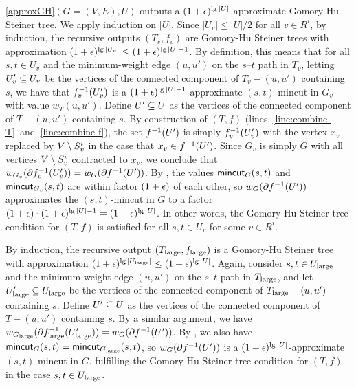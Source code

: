 \BL{}
\ref{approxGH}$(G=(V,E),U)$ outputs a $(1+\epsilon)^{\lg|U|}$-approximate Gomory-Hu Steiner tree.
\EL
\BP
We apply induction on $|U|$. 
Since $|U_v|\le|U|/2$ for all $v\in R^i$, by induction, the recursive outputs $(T_v,f_v)$ are Gomory-Hu Steiner trees with approximation $(1+\epsilon)^{\lg|U_v|}\le(1+\epsilon)^{\lg|U|-1}$.  By definition, this means that for all $s,t\in U_v$ and the minimum-weight edge $(u,u')$ on the $s$--$t$ path in $T_v$, letting $U'_v\subseteq U_v$ be the vertices of the connected component of $T_v-(u,u')$ containing $s$, we have that $f^{-1}_v(U'_v)$ is a $(1+\epsilon)^{\lg|U|-1}$-approximate $(s,t)$-mincut in $G_v$ with value $w_T(u,u')$. Define $U'\subseteq U$ as the vertices of the connected component of $T-(u,u')$ containing $s$. By construction of $(T,f)$ (lines~\ref{line:combine-T}~and~\ref{line:combine-f}), the set $f^{-1}(U')$ is simply $f^{-1}_v(U'_v)$ with the vertex $x_v$ replaced by $V\setminus S^i_v$ in the case that $x_v\in f^{-1}(U')$. Since $G_v$ is simply $G$ with all vertices $V\setminus S^i_v$ contracted to $x_v$, we conclude that $w_{G_v}(\partial f^{-1}_v(U'_v)) = w_G(\partial f^{-1}(U'))$. By , the values $\textsf{\textup{mincut}}_G(s,t)$ and $\textsf{\textup{mincut}}_{G_v}(s,t)$ are within factor $(1+\epsilon)$ of each other, so $w_G(\partial f^{-1}(U'))$ approximates the $(s,t)$-mincut in $G$ to a factor $(1+\epsilon)\cdot(1+\epsilon)^{\lg|U|-1} = (1+\epsilon)^{\lg|U|}$. In other words, the Gomory-Hu Steiner tree condition for $(T,f)$ is satisfied for all $s,t\in U_v$ for some $v\in R^i$.

By induction, the recursive output $(T_{\textup{large}},f_{\textup{large}})$ is a Gomory-Hu Steiner tree with approximation $(1+\epsilon)^{\lg|U_{\textup{large}}|}\le(1+\epsilon)^{\lg|U|}$. Again, consider $s,t\in U_{\textup{large}}$ and the minimum-weight edge $(u,u')$ on the $s$--$t$ path in $T_{\textup{large}}$, and let $U'_{\textup{large}}\subseteq U_{\textup{large}}$ be the vertices of the connected component of $T_{\textup{large}}-(u,u')$ containing $s$. Define $U'\subseteq U$ as the vertices of the connected component of $T-(u,u')$ containing $s$. By a similar argument, we have $w_{G_{\textup{large}}}(\partial f^{-1}_{\textup{large}}(U'_{\textup{large}})) = w_G(\partial f^{-1}(U'))$. By , we also have $\textsf{\textup{mincut}}_G(s,t)=\textsf{\textup{mincut}}_{G_{\textup{large}}}(s,t)$, so $w_G(\partial f^{-1}(U'))$ is a $(1+\epsilon)^{\lg|U|}$-approximate $(s,t)$-mincut in $G$, fulfilling the Gomory-Hu Steiner tree condition for $(T,f)$ in the case $s,t\in U_{\textup{large}}$.

